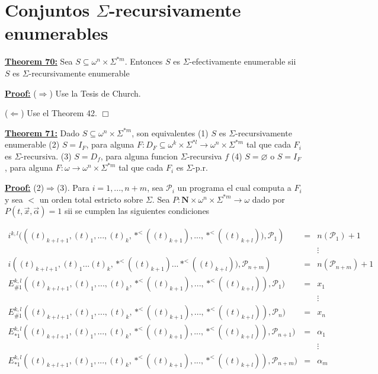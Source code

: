 \section{Conjuntos $\Sigma$-recursivamente enumerables}

\textbf{\underline{Theorem 70:}} Sea \(S\subseteq \omega ^{n}\times \Sigma ^{\ast m}\). Entonces \(S\) es \(\Sigma \)-efectivamente enumerable sii \(S\) es \(\Sigma \)-recursivamente enumerable


\textbf{\underline{Proof:}} (\(\Rightarrow \)) Use la Tesis de Church.

(\(\Leftarrow \)) Use el Theorem 42. \(\Box\)



\textbf{\underline{Theorem 71:}} Dado \(S\subseteq \omega ^{n}\times \Sigma ^{\ast m} \), son equivalentes
(1) \(S\) es \(\Sigma \)-recursivamente enumerable
(2) \(S=I_{F}\), para alguna \(F:D_{F}\subseteq \omega ^{k}\times \Sigma ^{\ast l}\rightarrow \omega ^{n}\times \Sigma ^{\ast m}\) tal que cada \(F_{i}\) es \(\Sigma \)-recursiva.
(3) \(S=D_{f}\), para alguna funcion \(\Sigma \)-recursiva \(f\)
(4) \(S=\varnothing \) o \(S=I_{F}\), para alguna \(F:\omega \rightarrow \omega ^{n}\times \Sigma ^{\ast m}\) tal que cada \(F_{i}\) es \(\Sigma \)-p.r.


\textbf{\underline{Proof:}} (2)\(\Rightarrow \)(3). Para \(i=1,...,n+m\), sea \(\mathcal{P}_{i}\) un programa el cual computa a \(F_{i}\) y sea \(< \) un orden total estricto sobre \(\Sigma \). Sea \(P:\mathbf{N}\times \omega ^{n}\times \Sigma ^{\ast m}\rightarrow \omega \) dado por \(P(t,\vec{x},\vec{\alpha})=1\) sii se cumplen las siguientes condiciones

\(\displaystyle \begin{array}{rcl} i^{k,l}(\left( (t)_{k+l+1},(t)_{1},...,(t)_{k},\ast ^{< }((t)_{k+1}),...,\ast ^{< }((t)_{k+l})),\mathcal{P}_{1}\right) & =& n(\mathcal{P}_{1})+1 \\ & & \vdots \\ i\left( (t)_{k+l+1},(t)_{1}...(t)_{k},\ast ^{< }((t)_{k+1})...\ast ^{< }((t)_{k+l})),\mathcal{P}_{n+m}\right) & =& n(\mathcal{P}_{n+m})+1 \\ E_{\#1}^{k,l}((t)_{k+l+1},(t)_{1},...,(t)_{k},\ast ^{< }((t)_{k+1}),...,\ast ^{< }((t)_{k+l})),\mathcal{P}_{1}) & =& x_{1} \\ & & \vdots \\ E_{\#1}^{k,l}((t)_{k+l+1},(t)_{1},...,(t)_{k},\ast ^{< }((t)_{k+1}),...,\ast ^{< }((t)_{k+l})),\mathcal{P}_{n}) & =& x_{n} \\ E_{\ast 1}^{k,l}((t)_{k+l+1},(t)_{1},...,(t)_{k},\ast ^{< }((t)_{k+1}),...,\ast ^{< }((t)_{k+l})),\mathcal{P}_{n+1}) & =& \alpha _{1} \\ & & \vdots \\ E_{\ast 1}^{k,l}((t)_{k+l+1},(t)_{1},...,(t)_{k},\ast ^{< }((t)_{k+1}),...,\ast ^{< }((t)_{k+l})),\mathcal{P}_{n+m}) & =& \alpha _{m} \end{array} \)

